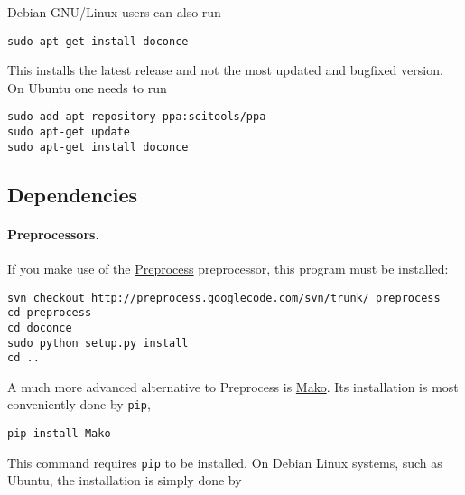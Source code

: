 \documentclass[twoside]{article}
\begin{document}
Debian GNU/Linux users can also run
\vspace{4pt}
\begin{Verbatim}[numbers=none,frame=lines,label=\fbox{{\tiny Terminal}},fontsize=\fontsize{9pt}{9pt},
labelposition=topline,framesep=2.5mm,framerule=0.7pt]
sudo apt-get install doconce
\end{Verbatim}
This installs the latest release and not the most updated and bugfixed
version.
On Ubuntu one needs to run
\vspace{4pt}
\begin{Verbatim}[numbers=none,frame=lines,label=\fbox{{\tiny Terminal}},fontsize=\fontsize{9pt}{9pt},
labelposition=topline,framesep=2.5mm,framerule=0.7pt]
sudo add-apt-repository ppa:scitools/ppa
sudo apt-get update
sudo apt-get install doconce
\end{Verbatim}

\subsection{Dependencies}

\paragraph{Preprocessors.}
If you make use of the \href{{http://code.google.com/p/preprocess}}{Preprocess}
preprocessor, this program must be installed:

\vspace{4pt}
\begin{Verbatim}[numbers=none,frame=lines,label=\fbox{{\tiny Terminal}},fontsize=\fontsize{9pt}{9pt},
labelposition=topline,framesep=2.5mm,framerule=0.7pt]
svn checkout http://preprocess.googlecode.com/svn/trunk/ preprocess
cd preprocess
cd doconce
sudo python setup.py install
cd ..
\end{Verbatim}

A much more advanced alternative to Preprocess is
\href{{http://www.makotemplates.org}}{Mako}. Its installation is most
conveniently done by {\fontsize{10pt}{10pt}\verb!pip!},

\vspace{4pt}
\begin{Verbatim}[numbers=none,frame=lines,label=\fbox{{\tiny Terminal}},fontsize=\fontsize{9pt}{9pt},
labelposition=topline,framesep=2.5mm,framerule=0.7pt]
pip install Mako
\end{Verbatim}
This command requires {\fontsize{10pt}{10pt}\verb!pip!} to be installed. On Debian Linux systems,
such as Ubuntu, the installation is simply done by
\end{document}
